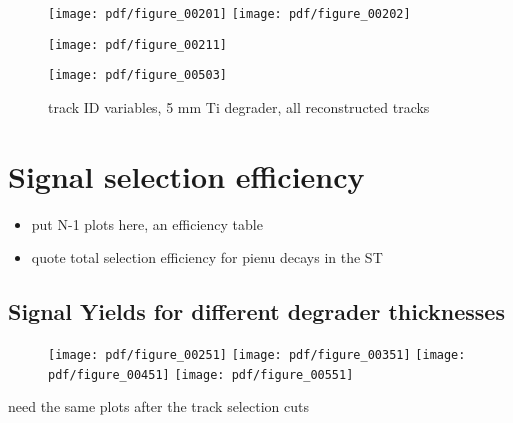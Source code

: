 \begin{figure}[H]
  \texttt{[image: pdf/figure\_00201]}
  \texttt{[image: pdf/figure\_00202]}
  \caption{
  }
\end{figure}

\begin{figure}[H]
  \texttt{[image: pdf/figure\_00211]}
  \caption{
  }
\end{figure}

\begin{figure}[H]
  \texttt{[image: pdf/figure\_00503]}
  \caption{
    track ID variables, 5 mm Ti degrader, all reconstructed tracks
  }
\end{figure}


\section{Signal selection efficiency}

{\red
  \begin{itemize}
  \item 
    put N-1 plots here, an efficiency table
  \item
    quote total selection efficiency for pienu decays in the ST
  \end{itemize}



}


\subsection {Signal Yields for different degrader thicknesses}
\begin{figure}[H]
  \texttt{[image: pdf/figure\_00251]}
  \texttt{[image: pdf/figure\_00351]}
  \texttt{[image: pdf/figure\_00451]}
  \texttt{[image: pdf/figure\_00551]}
  \caption{
  }
\end{figure}

{\red need the same plots after the track selection cuts}

